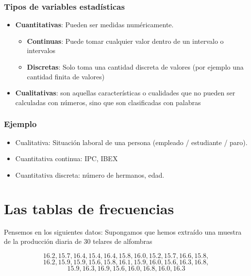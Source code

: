 \documentclass[
]{article}
\providecommand{\tightlist}{%
  \setlength{\itemsep}{0pt}\setlength{\parskip}{0pt}}
\begin{document}
\hypertarget{tipos-de-variables-estaduxedsticas}{%
\subsubsection{Tipos de variables
estadísticas}\label{tipos-de-variables-estaduxedsticas}}

\begin{itemize}
\tightlist
\item
  \textbf{Cuantitativas}: Pueden ser medidas numéricamente.

  \begin{itemize}
  \tightlist
  \item
    \textbf{Continuas}: Puede tomar cualquier valor dentro de un
    intervalo o intervalos
  \item
    \textbf{Discretas}: Solo toma una cantidad discreta de valores (por
    ejemplo una cantidad finita de valores)
  \end{itemize}
\item
  \textbf{Cualitativas}: son aquellas características o cualidades que
  no pueden ser calculadas con números, sino que son clasificadas con
  palabras
\end{itemize}

\hypertarget{ejemplo-1}{%
\subsubsection{Ejemplo}\label{ejemplo-1}}

\begin{itemize}
\tightlist
\item
  Cualitativa: Situación laboral de una persona (empleado / estudiante /
  paro).
\item
  Cuantitativa continua: IPC, IBEX
\item
  Cuantitativa discreta: número de hermanos, edad.
\end{itemize}

\hypertarget{las-tablas-de-frecuencias}{%
\section{Las tablas de frecuencias}\label{las-tablas-de-frecuencias}}

Pensemos en los siguientes datos: Supongamos que hemos extraído una
muestra de la producción diaria de 30 telares de alfombras

\[16.2, 15.7, 16.4, 15.4, 16.4, 15.8, 16.0, 15.2, 15.7, 16.6, 15.8,\]
\[ 16.2, 15.9, 15.9, 15.6, 15.8, 16.1, 15.9, 16.0, 15.6, 16.3, 16.8,\]
\[ 15.9, 16.3, 16.9, 15.6, 16.0, 16.8, 16.0, 16.3\]
\end{document}
